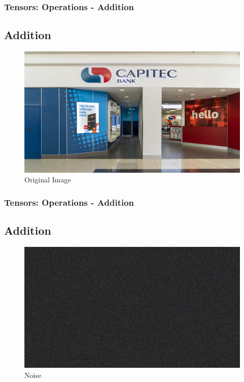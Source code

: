 \documentclass[11pt]{beamer}
\begin{document}
\begin{frame}
	\frametitle{Tensors: Operations - Addition}
	\subsection{Addition}
		 \begin{figure}
		\includegraphics[scale=0.17]{"1 - original_image"}
		\caption{Original Image}
	\end{figure}
\end{frame}

\begin{frame}
	\frametitle{Tensors: Operations - Addition}
	\subsection{Addition}
	\begin{figure}
		\includegraphics[scale=0.17]{"2 - gauss_noise"}
		\caption{Noise}
	\end{figure}
\end{frame}
\end{document}
